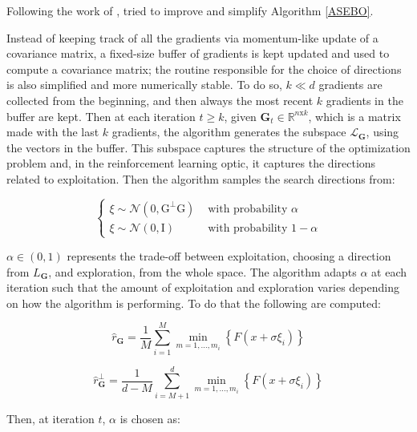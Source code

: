 Following the work of \cite{Choromanski2019}, \cite{Liu2020a} tried to improve and simplify Algorithm \ref{ASEBO}. 

Instead of keeping
track of all the gradients via momentum-like update of a covariance matrix, a fixed-size buffer of gradients is kept
updated and used to compute a covariance matrix; the routine responsible for the choice of directions is also simplified
and more numerically stable. To do so, $k\ll d$ gradients are collected from the beginning, and then always the most recent $k$ gradients in the buffer are kept. Then at each iteration $t \geq k$, given $\mathbf{G}_t\in \mathbb{R}^{n\text{x} k}$, which is a matrix made with the last $k$ gradients, the algorithm generates the subspace $\mathcal{L}_\mathbf{G}$, using the vectors in the buffer. This subspace captures the structure of the optimization problem and, in the reinforcement learning optic, it captures the directions related to exploitation.
Then the algorithm samples the search directions from:

\begin{equation}\label{historical sampling}
	\left\{\begin{array}{ll}\xi \sim \mathcal{N}\left(0, \mathrm{G}^{\perp} \mathrm{G}\right) & \text { with probability } \alpha \\ \xi \sim \mathcal{N}(0, \mathrm{I}) & \text { with probability } 1-\alpha\end{array}\right. 
\end{equation}

$\alpha\in\left( 0,1 \right)$ represents the trade-off between exploitation, choosing a direction from $L_\mathbf{G}$, and exploration, from the whole space. The algorithm adapts $\alpha$ at each iteration such that the amount of exploitation and exploration varies depending on how the algorithm is performing. To do that the following are computed:

\begin{equation}
	\widehat{r}_{\mathbf{G}}=\frac{1}{M} \sum_{i=1}^{M} \min_{m=1,\dots,m_i} \left\{ F\left( x+\sigma \xi_i \right) \right\} 
\end{equation}

\begin{equation}
	\widehat{r}_{\mathbf{G}}^{\perp}=\frac{1}{d-M} \sum_{i=M+1}^{d} \min_{m=1,\dots,m_i} \left\{ F\left( x+\sigma \xi_i \right) \right\} 
\end{equation}

Then, at iteration $t$, $\alpha$ is chosen as:

